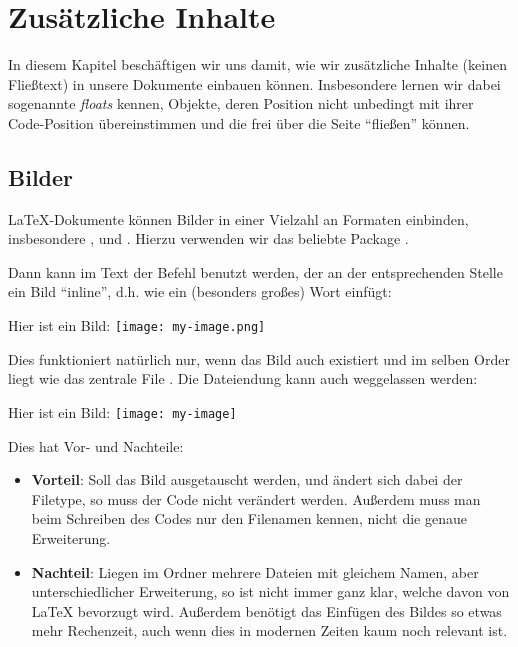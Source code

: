 \chapter{Zusätzliche Inhalte}
In diesem Kapitel beschäftigen wir uns damit, wie wir zusätzliche Inhalte (keinen Fließtext) in unsere Dokumente einbauen können.
Insbesondere lernen wir dabei sogenannte \emph{floats} kennen, Objekte, deren Position nicht unbedingt mit ihrer Code-Position übereinstimmen und die frei über die Seite \enquote{fließen} können.

\section{Bilder}
\LaTeX -Dokumente können Bilder in einer Vielzahl an Formaten einbinden, insbesondere ,  und .
Hierzu verwenden wir das beliebte Package .
\begin{latexlisting}
	\usepackage{graphicx}
\end{latexlisting}
Dann kann im Text der Befehl  benutzt werden, der an der entsprechenden Stelle ein Bild \enquote{inline}, d.h. wie ein (besonders großes) Wort einfügt:
\begin{latexlisting}
	Hier ist ein Bild:
	\texttt{[image: my-image.png]}
\end{latexlisting}
Dies funktioniert natürlich nur, wenn das Bild  auch existiert und im selben Order liegt wie das zentrale File .
Die Dateiendung  kann auch weggelassen werden:
\begin{latexlisting}
	Hier ist ein Bild:
	\texttt{[image: my-image]}
\end{latexlisting}
Dies hat Vor- und Nachteile:
\begin{itemize}
	\item \textbf{Vorteil}: Soll das Bild ausgetauscht werden, und ändert sich dabei der Filetype, so muss der Code nicht verändert werden.
	Außerdem muss man beim Schreiben des Codes nur den Filenamen kennen, nicht die genaue Erweiterung.
	\item \textbf{Nachteil}: Liegen im Ordner mehrere Dateien mit gleichem Namen, aber unterschiedlicher Erweiterung, so ist nicht immer ganz klar, welche davon von \LaTeX{} bevorzugt wird.
	Außerdem benötigt das Einfügen des Bildes so etwas mehr Rechenzeit, auch wenn dies in modernen Zeiten kaum noch relevant ist.
\end{itemize}
